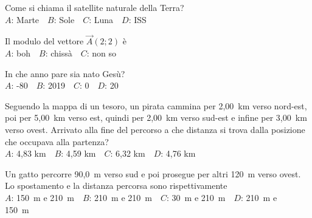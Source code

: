 \mcquestionfooter



\def\mcquestionnumber{5}


\mcquestionheader Come si chiama il satellite naturale della Terra?\\
{$A$}: Marte\ \ {$B$}: Sole\ \ {$C$}: Luna\ \ {$D$}: ISS\ \ 

\mcquestionfooter



\def\mcquestionnumber{6}


\mcquestionheader Il modulo del vettore $\vec{A}(2;2)$ è\\
{$A$}: boh\ \ {$B$}: chissà\ \ {$C$}: non so\ \ 

\mcquestionfooter



\def\mcquestionnumber{7}


\mcquestionheader In che anno pare sia nato Gesù?\\
{$A$}: -80\ \ {$B$}: 2019\ \ {$C$}: 0\ \ {$D$}: 20\ \ 

\mcquestionfooter



\def\mcquestionnumber{8}


\mcquestionheader Seguendo la mappa di un tesoro, un pirata cammina per 2,00~km verso nord-est, poi per 5,00~km verso est, quindi per 2,00~km verso sud-est e infine per 3,00~km verso ovest. Arrivato alla fine del percorso a che distanza si trova dalla posizione che occupava alla partenza?\\
{$A$}: 4,83 km\ \ {$B$}: 4,59 km\ \ {$C$}: 6,32 km\ \ {$D$}: 4,76 km\ \ 

\mcquestionfooter



\def\mcquestionnumber{9}


\mcquestionheader Un gatto percorre 90,0~m verso sud e poi prosegue per altri 120~m verso ovest. Lo spostamento e la distanza percorsa sono rispettivamente\\
{$A$}: 150~m e 210~m\ \ {$B$}: 210~m e 210~m\ \ {$C$}: 30~m e 210~m\ \ {$D$}: 210~m e 150~m\ \ 

\mcquestionfooter



\def\mcquestionnumber{10}


